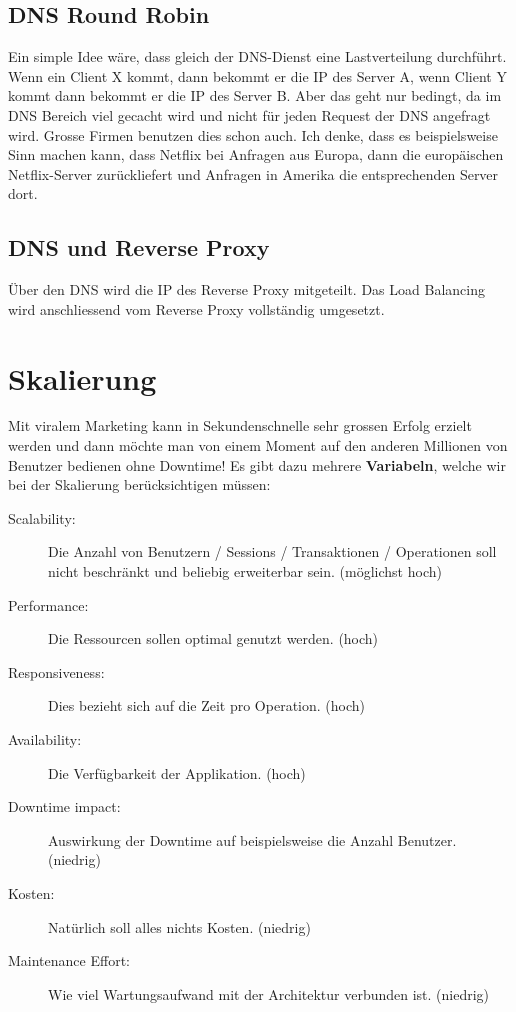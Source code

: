 \subsection{DNS Round Robin}
Ein simple Idee wäre, dass gleich der DNS-Dienst eine Lastverteilung durchführt. Wenn ein Client X kommt, dann bekommt er die IP des Server A, wenn Client Y kommt dann bekommt er die IP des Server B. Aber das geht nur bedingt, da im DNS Bereich viel gecacht wird und nicht für jeden Request der DNS angefragt wird. Grosse Firmen benutzen dies schon auch. Ich denke, dass es beispielsweise Sinn machen kann, dass Netflix bei Anfragen aus Europa, dann die europäischen Netflix-Server zurückliefert und Anfragen in Amerika die entsprechenden Server dort.

\subsection{DNS und Reverse Proxy}
Über den DNS wird die IP des Reverse Proxy mitgeteilt. Das Load Balancing wird anschliessend vom Reverse Proxy vollständig umgesetzt.

\section{Skalierung}
Mit viralem Marketing kann in Sekundenschnelle sehr grossen Erfolg erzielt werden und dann möchte man von einem Moment auf den anderen Millionen von Benutzer bedienen ohne Downtime! Es gibt dazu mehrere \textbf{Variabeln}, welche wir bei der Skalierung berücksichtigen müssen:

\begin{description}
	\item[Scalability:] Die Anzahl von Benutzern / Sessions / Transaktionen / Operationen soll nicht beschränkt und beliebig erweiterbar sein. (möglichst hoch)
	\item[Performance:] Die Ressourcen sollen optimal genutzt werden. (hoch)
	\item[Responsiveness:] Dies bezieht sich auf die Zeit pro Operation. (hoch)
	\item[Availability:] Die Verfügbarkeit der Applikation. (hoch)
	\item[Downtime impact:] Auswirkung der Downtime auf beispielsweise die Anzahl Benutzer. (niedrig)
	\item[Kosten:] Natürlich soll alles nichts Kosten. (niedrig)
	\item[Maintenance Effort:] Wie viel Wartungsaufwand mit der Architektur verbunden ist. (niedrig)
\end{description}

